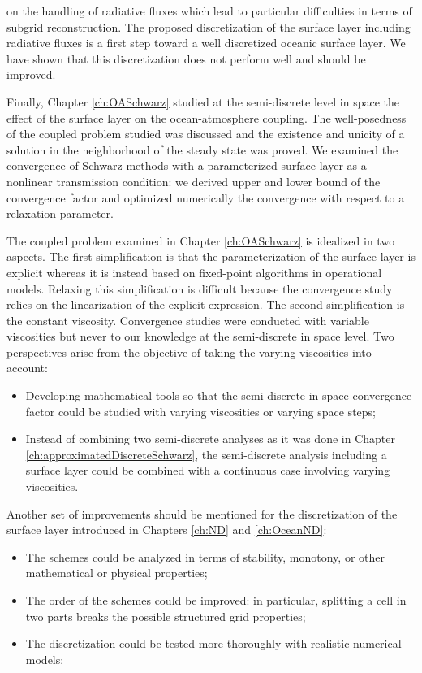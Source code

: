 on the handling of radiative fluxes which lead to particular
difficulties in terms of subgrid reconstruction. The proposed
discretization of the surface layer including radiative fluxes
is a first step toward a well discretized oceanic surface layer.
We have shown that this discretization does not perform well
and should be improved.
\par
Finally, Chapter \ref{ch:OASchwarz} studied at the semi-discrete
level in space the effect of the surface layer on the
ocean-atmosphere coupling.
The well-posedness of the coupled problem studied was discussed
and the existence and unicity of a solution in the neighborhood
of the steady state was proved.
We examined the convergence of Schwarz methods with a parameterized
surface layer as a nonlinear transmission condition:
we derived upper and lower bound of the convergence factor and
optimized numerically the convergence with respect to a relaxation
parameter.
\par
The coupled problem examined in Chapter
\ref{ch:OASchwarz} is idealized in two aspects. The first
simplification is that
the parameterization of the surface layer is explicit whereas
it is instead based on fixed-point algorithms in operational models.
Relaxing this simplification is difficult because the convergence
study relies on the linearization of the explicit expression.
The second simplification is the constant viscosity.
Convergence studies were conducted with variable viscosities but
never to our knowledge at the semi-discrete in space level.
Two perspectives arise from the objective of taking the
varying viscosities into account:
\begin{itemize}
	\item Developing mathematical tools so that the
		semi-discrete in space convergence factor could
		be studied with varying viscosities or
		varying space steps;
	\item Instead of combining two semi-discrete analyses
		as it was done in
	Chapter \ref{ch:approximatedDiscreteSchwarz}, 
	the semi-discrete analysis including a surface layer
	could be combined with a continuous case involving
	varying viscosities.
\end{itemize}
\par
Another set of improvements should be mentioned for the discretization
of the surface layer introduced in Chapters \ref{ch:ND} and
\ref{ch:OceanND}:
\begin{itemize}
\item The schemes could be analyzed in terms of stability, monotony,
	or other mathematical or physical properties;
\item The order of the schemes could be improved: in particular,
	splitting a cell in two parts breaks the possible structured
		grid properties;
\item The discretization could be tested more thoroughly with
	realistic numerical models;
\end{itemize}
